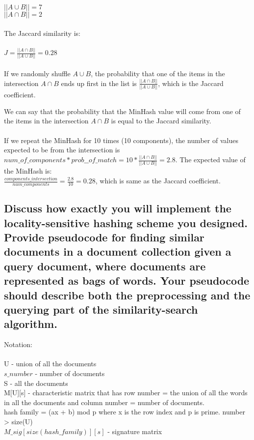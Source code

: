 \documentclass[11pt]{article}
\begin{document}
$ || A \cup B || = 7 $
\\
$ || A \cap B || = 2 $
\\~\\
The Jaccard similarity is:
\\~\\
$ J = \frac{|| A \cap B ||}{|| A \cup B ||} = 0.28 $
\\~\\
If we randomly shuffle $  A \cup B $, the probability that one of the items in the intersection $  A \cap B $ ends up first in the list is $ \frac{|| A \cap B ||}{|| A \cup B ||} $, which is the Jaccard coefficient.

We can say that the probability that the MinHash value will come from one of the items in the intersection $ A \cap B  $ is equal to the Jaccard similarity.
\\~\\
If we repeat the MinHash for 10 times (10 components), the number of values expected to be from the intersection is $ num\_of\_components * prob\_\_of\_match = 10 * \frac{|| A \cap B ||}{|| A \cup B ||} = 2.8 $.
The expected value of the MinHash is:
\\
$ \frac{components\_intersection}{num\_components} = \frac{2.8}{10} = 0.28 $, which is same as the Jaccard coefficient.

\subsection{Discuss how exactly you will implement the locality-sensitive hashing scheme you
designed. Provide pseudocode for finding similar documents in a document collection given a query
document, where documents are represented as bags of words. Your pseudocode should describe
both the preprocessing and the querying part of the similarity-search algorithm.}

Notation:
\\~\\
U - union of all the documents \\
$s\_number$ - number of documents \\
S - all the documents \\

M[U][s] - characteristic matrix that has row number = the union of all the words in all the documents and column number = number of documents.
\\
hash family = (ax + b) mod p where x is the row index and p is prime. number > size(U) \\
$M\_sig[size(hash\_family)][s]$ - signature matrix \\
\end{document}
